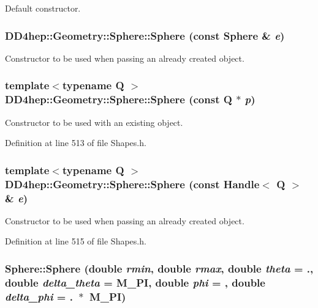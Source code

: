Default constructor. \hypertarget{class_d_d4hep_1_1_geometry_1_1_sphere_a9f5b1f3abd0830004af5ee8748794436}{
\subsubsection[{Sphere}]{\setlength{\rightskip}{0pt plus 5cm}DD4hep::Geometry::Sphere::Sphere (const {\bf Sphere} \& {\em e})}}
\label{class_d_d4hep_1_1_geometry_1_1_sphere_a9f5b1f3abd0830004af5ee8748794436}


Constructor to be used when passing an already created object. \hypertarget{class_d_d4hep_1_1_geometry_1_1_sphere_a526e8de71eeaf02a9a7324ef64805a65}{
\subsubsection[{Sphere}]{\setlength{\rightskip}{0pt plus 5cm}template$<$typename Q $>$ DD4hep::Geometry::Sphere::Sphere (const Q $\ast$ {\em p})}}
\label{class_d_d4hep_1_1_geometry_1_1_sphere_a526e8de71eeaf02a9a7324ef64805a65}


Constructor to be used with an existing object. 

Definition at line 513 of file Shapes.h.\hypertarget{class_d_d4hep_1_1_geometry_1_1_sphere_afea9cfe454786968ac5ab3a74bf29362}{
\subsubsection[{Sphere}]{\setlength{\rightskip}{0pt plus 5cm}template$<$typename Q $>$ DD4hep::Geometry::Sphere::Sphere (const {\bf Handle}$<$ Q $>$ \& {\em e})}}
\label{class_d_d4hep_1_1_geometry_1_1_sphere_afea9cfe454786968ac5ab3a74bf29362}


Constructor to be used when passing an already created object. 

Definition at line 515 of file Shapes.h.\hypertarget{class_d_d4hep_1_1_geometry_1_1_sphere_aaf2e06bdb209d1533dd7d2a3600f6493}{
\subsubsection[{Sphere}]{\setlength{\rightskip}{0pt plus 5cm}Sphere::Sphere (double {\em rmin}, \/  double {\em rmax}, \/  double {\em theta} = {.}, \/  double {\em delta\_\-theta} = {\ttfamily M\_\-PI}, \/  double {\em phi} = {}, \/  double {\em delta\_\-phi} = {.~$\ast$~M\_\-PI})}}
\label{class_d_d4hep_1_1_geometry_1_1_sphere_aaf2e06bdb209d1533dd7d2a3600f6493}


